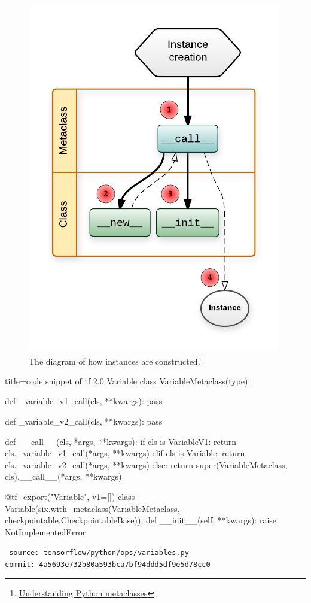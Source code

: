 \begin{frame}
    \begin{figure}[!tb]
        \includegraphics[width=0.7\onepicwidth]{figure/var/instance-creation}
        \caption{The diagram of how instances are constructed.\footnote{
                 \href{https://blog.ionelmc.ro/2015/02/09/understanding-python-metaclasses/}{Understanding Python metaclasses}}}
    \end{figure}
\end{frame}

\begin{frame}[fragile]
    \begin{tcblisting}{title=code snippet of tf 2.0 Variable}
            class VariableMetaclass(type):

              def _variable_v1_call(cls, **kwargs):
                pass

              def _variable_v2_call(cls, **kwargs):
                pass

              def __call__(cls, *args, **kwargs):
                if cls is VariableV1:
                  return cls._variable_v1_call(*args, **kwargs)
                elif cls is Variable:
                  return cls._variable_v2_call(*args, **kwargs)
                else:
                  return super(VariableMetaclass, cls).__call__(*args, **kwargs)

            @tf_export("Variable", v1=[])
            class Variable(six.with_metaclass(VariableMetaclass,
                                              checkpointable.CheckpointableBase)):
              def __init__(self, **kwargs):
                raise NotImplementedError
    \end{tcblisting}
    {\tiny \tt
    source: tensorflow/python/ops/variables.py \\[-2ex]
    commit: 4a5693e732b80a593bca7bf94ddd5df9e5d78cc0}
\end{frame}

